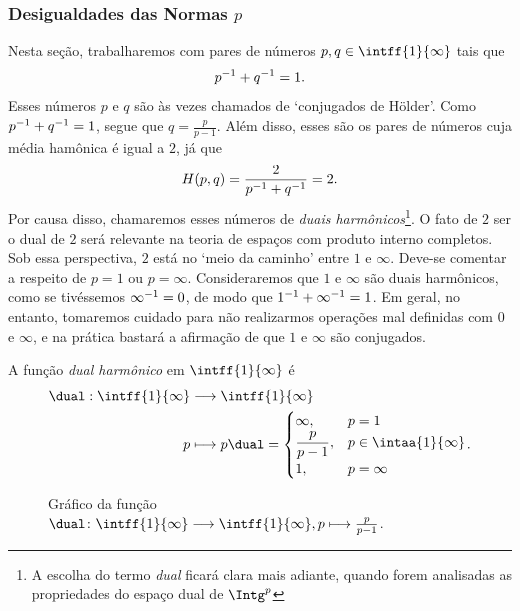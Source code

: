\subsubsection{Desigualdades das Normas \ensuremath{p}}

Nesta seção, trabalharemos com pares de números $p,q \in \intff{1}{\infty}$ tais que
	\begin{equation*}
	p^{-1} + q^{-1} = 1.
	\end{equation*}
Esses números $p$ e $q$ são às vezes chamados de `conjugados de Hölder'. Como $p^{-1} + q^{-1} = 1$, segue que $q = \frac{p}{p-1}$. Além disso, esses são os pares de números cuja média hamônica é igual a $2$, já que
	\begin{equation*}
	H(p,q) = \frac{2}{p^{-1} + q^{-1}} = 2.
	\end{equation*}
Por causa disso, chamaremos esses números de \textit{duais harmônicos}\footnote{A escolha do termo \textit{dual} ficará clara mais adiante, quando forem analisadas as propriedades do espaço dual de $\Intg^p$}. O fato de $2$ ser o dual de $2$ será relevante na teoria de espaços com produto interno completos. Sob essa perspectiva, $2$ está no `meio da caminho' entre $1$ e $\infty$. Deve-se comentar a respeito de $p=1$ ou $p=\infty$. Consideraremos que $1$ e $\infty$ são duais harmônicos, como se tivéssemos $\infty^{-1}=0$, de modo que $1^{-1} + \infty^{-1} = 1$. Em geral, no entanto, tomaremos cuidado para não realizarmos operações mal definidas com $0$ e $\infty$, e na prática bastará a afirmação de que $1$ e $\infty$ são conjugados.

\begin{defi}
A função \emph{dual harmônico} em $\intff{1}{\infty}$ é
	\begin{align*}
	\func{\dual}{\intff{1}{\infty}}{\intff{1}{\infty}}{p}{p\dual = 
	\begin{cases}
		\infty,& p=1 \\
		\displaystyle\frac{p}{p-1},& p \in \intaa{1}{\infty} \\
		1,& p=\infty
	\end{cases}	
	}.
	\end{align*}
\end{defi}

\begin{figure}
\centering
{}
\caption{Gráfico da função $\dual\colon \intff{1}{\infty} \to \intff{1}{\infty}, p \mapsto \frac{p}{p-1}$.}
\label{fig:dual.harmonico}
\end{figure}

